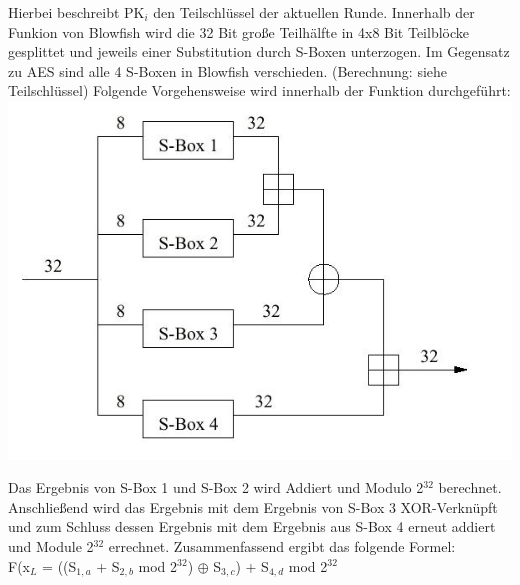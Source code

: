 \documentclass[10pt, a4paper,headsepline]{scrreprt}
\begin{document}
\begin{minipage}[t]{10cm}

Hierbei beschreibt PK$_{i}$ den Teilschlüssel der aktuellen Runde. Innerhalb der Funkion von Blowfish wird die 32 Bit große Teilhälfte in 4x8 Bit Teilblöcke gesplittet und jeweils einer Substitution durch S-Boxen unterzogen. Im Gegensatz zu AES sind alle 4 S-Boxen in Blowfish verschieden. (Berechnung: siehe Teilschlüssel) Folgende Vorgehensweise wird innerhalb der Funktion durchgeführt: \\
\includegraphics[scale=0.25]{blowfish_2.JPG} 
\label{fig:Funktion Blowfish} 
\hfill

Das Ergebnis von S-Box 1 und S-Box 2 wird Addiert und Modulo 2$^{32}$ berechnet. Anschließend wird das Ergebnis mit dem Ergebnis von S-Box 3 XOR-Verknüpft und zum Schluss dessen Ergebnis mit dem Ergebnis aus S-Box 4 erneut addiert und Module 2$^{32}$ errechnet. Zusammenfassend ergibt das folgende Formel: \\
F(x$_{L}$ = ((S$_{1,a}$ + S$_{2,b}$ mod 2$^{32}$) $\oplus$ S$_{3,c}$) + S$_{4,d}$ mod 2$^{32}$ \\ \\
\end{minipage}
\end{document}
